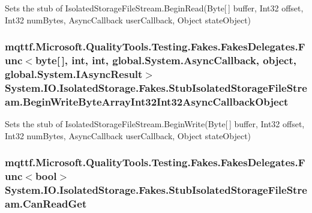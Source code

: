 Sets the stub of Isolated\-Storage\-File\-Stream.\-Begin\-Read(\-Byte\mbox{[}$\,$\mbox{]} buffer, Int32 offset, Int32 num\-Bytes, Async\-Callback user\-Callback, Object state\-Object)

\hypertarget{class_system_1_1_i_o_1_1_isolated_storage_1_1_fakes_1_1_stub_isolated_storage_file_stream_aafecb76050bc5538aae772569aebc831}{
\subsubsection[{Begin\-Write\-Byte\-Array\-Int32\-Int32\-Async\-Callback\-Object}]{\setlength{\rightskip}{0pt plus 5cm}mqttf.\-Microsoft.\-Quality\-Tools.\-Testing.\-Fakes.\-Fakes\-Delegates.\-Func$<$byte\mbox{[}$\,$\mbox{]}, int, int, global.\-System.\-Async\-Callback, object, global.\-System.\-I\-Async\-Result$>$ System.\-I\-O.\-Isolated\-Storage.\-Fakes.\-Stub\-Isolated\-Storage\-File\-Stream.\-Begin\-Write\-Byte\-Array\-Int32\-Int32\-Async\-Callback\-Object}}\label{class_system_1_1_i_o_1_1_isolated_storage_1_1_fakes_1_1_stub_isolated_storage_file_stream_aafecb76050bc5538aae772569aebc831}


Sets the stub of Isolated\-Storage\-File\-Stream.\-Begin\-Write(\-Byte\mbox{[}$\,$\mbox{]} buffer, Int32 offset, Int32 num\-Bytes, Async\-Callback user\-Callback, Object state\-Object)

\hypertarget{class_system_1_1_i_o_1_1_isolated_storage_1_1_fakes_1_1_stub_isolated_storage_file_stream_a6a4b90f83548120b09b1d57e6f43cfb6}{
\subsubsection[{Can\-Read\-Get}]{\setlength{\rightskip}{0pt plus 5cm}mqttf.\-Microsoft.\-Quality\-Tools.\-Testing.\-Fakes.\-Fakes\-Delegates.\-Func$<$bool$>$ System.\-I\-O.\-Isolated\-Storage.\-Fakes.\-Stub\-Isolated\-Storage\-File\-Stream.\-Can\-Read\-Get}}\label{class_system_1_1_i_o_1_1_isolated_storage_1_1_fakes_1_1_stub_isolated_storage_file_stream_a6a4b90f83548120b09b1d57e6f43cfb6}


